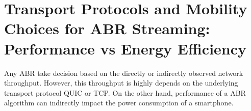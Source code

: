 \section{Transport Protocols and Mobility Choices for ABR Streaming: Performance vs Energy Efficiency}
Any ABR take decision based on the directly or indirectly observed network throughput. However, this throughput is highly depends on the underlying transport protocol QUIC or TCP. On the other hand, performance of a ABR algorithm can indirectly impact the power consumption of a smartphone. 